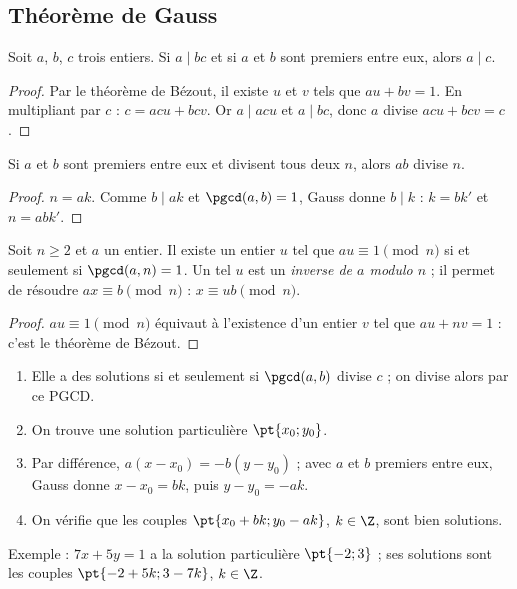 \subsection{Théorème de Gauss}
\begin{theorem}
Soit $a$, $b$, $c$ trois entiers. Si $a\mid bc$ et si $a$ et $b$ sont premiers entre eux, alors $a\mid c$.
\end{theorem}
\begin{proof}
Par le théorème de Bézout, il existe $u$ et $v$ tels que $au+bv=1$. En multipliant par $c$ : $c=acu+bcv$. Or $a\mid acu$ et $a\mid bc$, donc $a$ divise $acu+bcv=c$.
\end{proof}
\begin{theorem}[Corollaire]
Si $a$ et $b$ sont premiers entre eux et divisent tous deux $n$, alors $ab$ divise $n$.
\end{theorem}
\begin{proof}
$n=ak$. Comme $b\mid ak$ et $\pgcd(a,b)=1$, Gauss donne $b\mid k$ : $k=bk'$ et $n=abk'$.
\end{proof}
\begin{theorem}
Soit $n\ge2$ et $a$ un entier. Il existe un entier $u$ tel que $au\equiv1\pmod n$ si et seulement si $\pgcd(a,n)=1$. Un tel $u$ est un \emph{inverse de $a$ modulo $n$} ; il permet de résoudre $ax\equiv b\pmod n$ : $x\equiv ub\pmod n$.
\end{theorem}
\begin{proof}
$au\equiv1\pmod n$ équivaut à l'existence d'un entier $v$ tel que $au+nv=1$ : c'est le théorème de Bézout.
\end{proof}
\begin{method}[Équation $ax+by=c$ en nombres entiers]
\begin{enumerate}
\item Elle a des solutions si et seulement si $\pgcd(a,b)$ divise $c$ ; on divise alors par ce PGCD.
\item On trouve une solution particulière $\pt{x_0;y_0}$.
\item Par différence, $a(x-x_0)=-b(y-y_0)$ ; avec $a$ et $b$ premiers entre eux, Gauss donne $x-x_0=bk$, puis $y-y_0=-ak$.
\item On vérifie que les couples $\pt{x_0+bk;y_0-ak}$, $k\in\Z$, sont bien solutions.
\end{enumerate}
Exemple : $7x+5y=1$ a la solution particulière $\pt{-2;3}$ ; ses solutions sont les couples $\pt{-2+5k;3-7k}$, $k\in\Z$.
\end{method}

